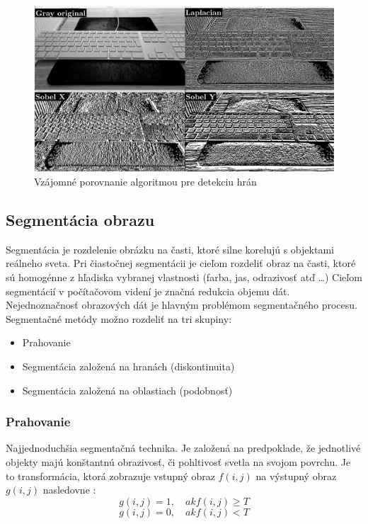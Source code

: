 \begin{figure}[H]
\begin{center}
	\includegraphics[scale=0.13]{images/edgeDetector}
	\caption{Vzájomné porovnanie algoritmou pre detekciu hrán}
	\end{center}
\end{figure}


\subsection{Segmentácia obrazu}
Segmentácia je rozdelenie obrázku na časti, ktoré silne korelujú s objektami reálneho sveta. Pri čiastočnej segmentácii je cieľom rozdeliť obraz na časti, ktoré sú homogénne z hľadiska vybranej vlastnosti (farba, jas, odrazivosť atď …) Cieľom segmentácií v počítačovom videní je značná redukcia objemu dát. Nejednoznačnosť obrazových dát je hlavným problémom segmentačného procesu. \cite{pocitacove_videnie_v_praxi} Segmentačné metódy možno rozdeliť na tri skupiny: 


\begin{itemize}
\item Prahovanie
\item Segmentácia založená na hranách (diskontinuita)
\item Segmentácia založená na oblastiach (podobnosť)
\end{itemize}

\subsubsection{Prahovanie}
\label{sec:treasholding}
Najjednoduchšia segmentačná technika. Je založená na predpoklade, že jednotlivé objekty majú konštantnú obrazivosť, či pohltivosť svetla na svojom povrchu. Je to transformácia, ktorá zobrazuje vstupný obraz $f(i, j)$ na výstupný obraz $g(i, j)$ nasledovne \cite{fit_trasholding}: 
$$g (i{,}j)=1 {,}\quad {ak} f(i{,}j)\ge T$$
$$g (i{,}j)=0 {,}\quad {ak} f(i{,}j)  < T$$


